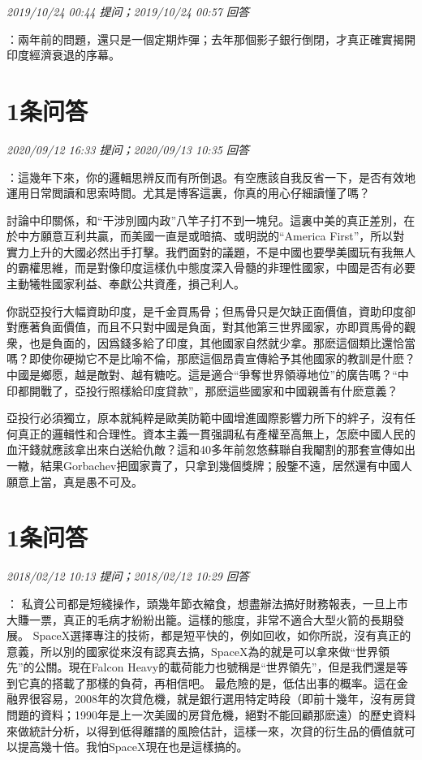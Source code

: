 \documentclass[twocolumn]{ctexart}
\begin{document}
\textit{\hfill\noindent\small 2019/10/24 00:44 提问；2019/10/24 00:57 回答}

：兩年前的問題，還只是一個定期炸彈；去年那個影子銀行倒閉，才真正確實揭開印度經濟衰退的序幕。
\\

\section{1条问答}

\textit{\hfill\noindent\small 2020/09/12 16:33 提问；2020/09/13 10:35 回答}

：這幾年下來，你的邏輯思辨反而有所倒退。有空應該自我反省一下，是否有效地運用日常閲讀和思索時間。尤其是博客這裏，你真的用心仔細讀懂了嗎？

討論中印關係，和“干涉別國内政”八竿子打不到一塊兒。這裏中美的真正差別，在於中方願意互利共贏，而美國一直是或暗搞、或明説的“America First”，所以對實力上升的大國必然出手打擊。我們面對的議題，不是中國也要學美國玩有我無人的霸權思維，而是對像印度這樣仇中態度深入骨髓的非理性國家，中國是否有必要主動犧牲國家利益、奉獻公共資產，損己利人。

你説亞投行大幅資助印度，是千金買馬骨；但馬骨只是欠缺正面價值，資助印度卻對應著負面價值，而且不只對中國是負面，對其他第三世界國家，亦即買馬骨的觀衆，也是負面的，因爲錢多給了印度，其他國家自然就少拿。那麽這個類比還恰當嗎？即使你硬拗它不是比喻不倫，那麽這個昂貴宣傳給予其他國家的教訓是什麽？中國是鄉愿，越是敵對、越有糖吃。這是適合“爭奪世界領導地位”的廣告嗎？“中印都開戰了，亞投行照樣給印度貸款”，那麽這些國家和中國親善有什麽意義？

亞投行必須獨立，原本就純粹是歐美防範中國增進國際影響力所下的絆子，沒有任何真正的邏輯性和合理性。資本主義一貫强調私有產權至高無上，怎麽中國人民的血汗錢就應該拿出來白送給仇敵？這和40多年前忽悠蘇聯自我閹割的那套宣傳如出一轍，結果Gorbachev把國家賣了，只拿到幾個獎牌；殷鑒不遠，居然還有中國人願意上當，真是愚不可及。
\\

\section{1条问答}

\textit{\hfill\noindent\small 2018/02/12 10:13 提问；2018/02/12 10:29 回答}

：
私資公司都是短綫操作，頭幾年節衣縮食，想盡辦法搞好財務報表，一旦上市大賺一票，真正的毛病才紛紛出籠。這樣的態度，非常不適合大型火箭的長期發展。
SpaceX選擇專注的技術，都是短平快的，例如回收，如你所説，沒有真正的意義，所以別的國家從來沒有認真去搞，SpaceX為的就是可以拿來做“世界領先”的公關。現在Falcon Heavy的載荷能力也號稱是“世界領先”，但是我們還是等到它真的搭載了那樣的負荷，再相信吧。
最危險的是，低估出事的概率。這在金融界很容易，2008年的次貸危機，就是銀行選用特定時段（即前十幾年，沒有房貸問題的資料；1990年是上一次美國的房貸危機，絕對不能回顧那麽遠）的歷史資料來做統計分析，以得到低得離譜的風險估計，這樣一來，次貸的衍生品的價值就可以提高幾十倍。我怕SpaceX現在也是這樣搞的。
\\
\end{document}
